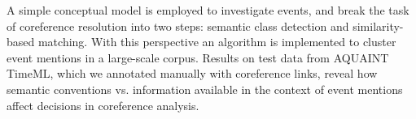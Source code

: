 A simple conceptual model is employed to investigate events, and break the task of coreference resolution into two steps: semantic class detection and similarity-based matching. With this perspective an algorithm is implemented to cluster event mentions in a large-scale corpus. Results on test data from AQUAINT TimeML, which we annotated manually with coreference links, reveal how semantic conventions vs. information available in the context of event mentions affect decisions in coreference analysis.
